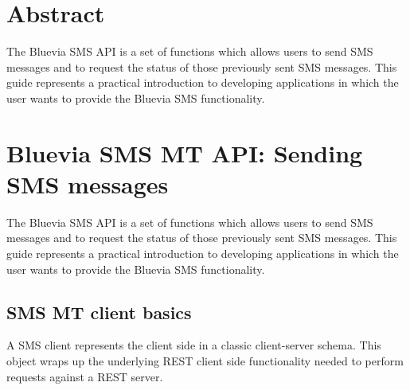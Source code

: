 \hypertarget{blv_sms_mt_guide_sms_mt_abstract_sec}{}\section{Abstract}\label{blv_sms_mt_guide_sms_mt_abstract_sec}
The Bluevia SMS API is a set of functions which allows users to send SMS messages and to request the status of those previously sent SMS messages. This guide represents a practical introduction to developing applications in which the user wants to provide the Bluevia SMS functionality.\hypertarget{blv_sms_mt_guide_blv_sms_mt_api_sending_sms_messages_sec}{}\section{Bluevia SMS MT API: Sending SMS messages}\label{blv_sms_mt_guide_blv_sms_mt_api_sending_sms_messages_sec}
The Bluevia SMS API is a set of functions which allows users to send SMS messages and to request the status of those previously sent SMS messages. This guide represents a practical introduction to developing applications in which the user wants to provide the Bluevia SMS functionality.\hypertarget{blv_sms_mt_guide_sms_mt_client_basics_sec}{}\subsection{SMS MT client basics}\label{blv_sms_mt_guide_sms_mt_client_basics_sec}
A SMS client represents the client side in a classic client-\/server schema. This object wraps up the underlying REST client side functionality needed to perform requests against a REST server.

